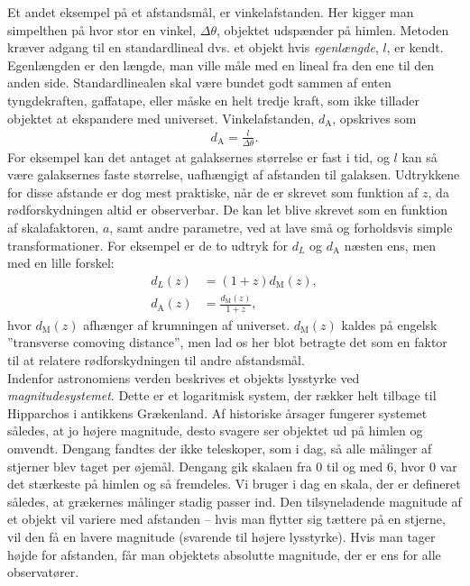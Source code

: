 Et andet eksempel på et afstandsmål, er vinkelafstanden. Her kigger man simpelthen på hvor stor en vinkel, $\Delta \theta$, objektet udspænder på himlen. Metoden kræver adgang til en standardlineal dvs. et objekt hvis \textit{egenlængde}, $l$, er kendt. Egenlængden er den længde, man ville måle med en lineal fra den ene til den anden side. Standardlinealen skal være bundet godt sammen af enten tyngdekraften, gaffatape, eller måske en helt tredje kraft, som ikke tillader objektet at ekspandere med universet.  Vinkelafstanden, $d_\text{A}$, opskrives som
\begin{align}
	d_\text{A}=\frac{l}{\Delta \theta}.
\end{align}
For eksempel kan det antaget at galaksernes størrelse er fast i tid, og $l$ kan så være galaksernes faste størrelse, uafhængigt af afstanden til galaksen.
Udtrykkene for disse afstande er dog mest praktiske, når de er skrevet som funktion af $z$, da rødforskydningen altid er observerbar. De kan let blive skrevet som en funktion af skalafaktoren, $a$, samt andre parametre, ved at lave små og forholdsvis simple transformationer. For eksempel er de to udtryk for $d_L$ og $d_\text{A}$ næsten ens, men med en lille forskel:
\begin{align}
d_L(z) &= (1+z)d_\text{M}(z), \\
d_\text{A}(z) &=\frac{d_\text{M}(z)}{1+z},
\end{align}
hvor $d_\text{M}(z)$ afhænger af krumningen af universet. $d_\text{M}(z)$ kaldes på engelsk ''transverse comoving distance'', men lad os her blot betragte det som en faktor til at relatere rødforskydningen til andre afstandsmål. \\

Indenfor astronomiens verden beskrives et objekts lysstyrke ved \emph{magnitudesystemet}. Dette er et logaritmisk system, der rækker helt tilbage til Hipparchos i antikkens Grækenland. Af historiske årsager fungerer systemet således, at jo højere magnitude, desto svagere ser objektet ud på himlen og omvendt. Dengang fandtes der ikke teleskoper, som i dag, så alle målinger af stjerner blev taget per øjemål. Dengang gik skalaen fra 0 til og med 6, hvor 0 var det stærkeste på himlen og så fremdeles. Vi bruger i dag en skala, der er defineret således, at grækernes målinger stadig passer ind. Den tilsyneladende magnitude af et objekt vil variere med afstanden -- hvis man flytter sig tættere på en stjerne, vil den få en lavere magnitude (svarende til højere lysstyrke). Hvis man tager højde for afstanden, får man objektets absolutte magnitude, der er ens for alle observatører.

